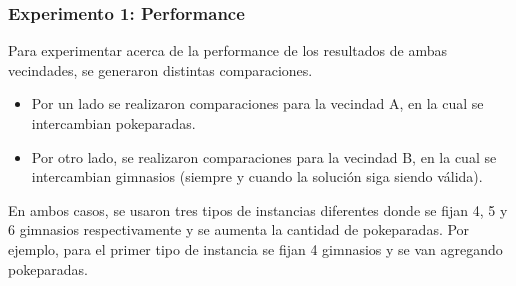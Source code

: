 \subsubsection{Experimento 1: Performance} 
            Para experimentar acerca de la performance de los resultados de ambas vecindades, se generaron distintas comparaciones. 

            \begin{itemize}
                \item Por un lado se realizaron comparaciones para la vecindad A, en la cual se intercambian pokeparadas.
 
                \item Por otro lado, se realizaron comparaciones para la vecindad B, en la cual se intercambian gimnasios (siempre y cuando la solución siga siendo válida).
            \end{itemize}
			
			En ambos casos, se usaron tres tipos de instancias diferentes donde se fijan 4, 5 y 6 gimnasios respectivamente y se aumenta la cantidad de pokeparadas. Por ejemplo, para el primer tipo de instancia se fijan 4 gimnasios y se van agregando pokeparadas.

\blindtext


